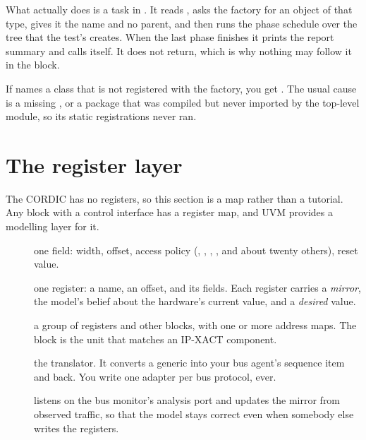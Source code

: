 \begin{notebox}{What  actually does}
 is a task in . It reads
, asks the factory for an object of that type, gives it
the name  and no parent, and then runs the phase
schedule over the tree that the test's  creates. When the
last phase finishes it prints the report summary and calls 
itself. It does not return, which is why nothing may follow it in the
 block.

If  names a class that is not registered with the
factory, you get . The usual cause is a missing
, or a package that was compiled but never
imported by the top-level module, so its static registrations never ran.
\end{notebox}

\section{The register layer}
\label{sec:uvm:reg}

%
The CORDIC has no registers, so this section is a map rather than a
tutorial. Any block with a control interface has a register map, and UVM
provides a modelling layer for it.

\begin{description}
  \item[] one field: width, offset, access policy
        (, , , , and about twenty
        others), reset value.
  \item[] one register: a name, an offset, and its fields.
        Each register carries a \emph{mirror}, the model's belief about the
        hardware's current value, and a \emph{desired} value.
  \item[] a group of registers and other blocks, with
        one or more address maps. The block is the unit that matches an
        IP-XACT component.
  \item[] the translator. It converts a generic
         into your bus agent's sequence item and
        back. You write one adapter per bus protocol, ever.
  \item[] listens on the bus monitor's analysis
        port and updates the mirror from observed traffic, so that the model
        stays correct even when somebody else writes the registers.
\end{description}

